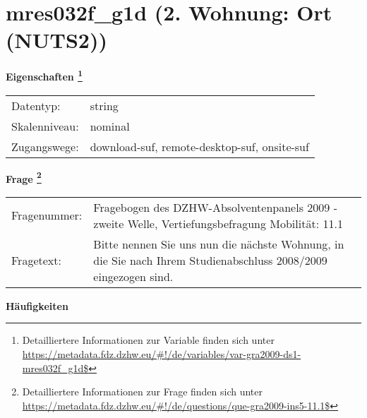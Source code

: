 
    \setcounter{footnote}{0}

    \vspace*{-1.8cm}
	\section{mres032f\_g1d (2. Wohnung: Ort (NUTS2))}
	\label{section:mres032f_g1d}



    \vspace*{0.5cm}
    \noindent\textbf{Eigenschaften
	\footnote{Detailliertere Informationen zur Variable finden sich unter
		\url{https://metadata.fdz.dzhw.eu/\#!/de/variables/var-gra2009-ds1-mres032f_g1d$}}}\\
	\begin{tabularx}{\hsize}{@{}lX}
	Datentyp: & string \\
	Skalenniveau: & nominal \\
	Zugangswege: &
	  download-suf, 
	  remote-desktop-suf, 
	  onsite-suf
 \\
    \end{tabularx}



				\vspace*{0.5cm}
                \noindent\textbf{Frage
	                \footnote{Detailliertere Informationen zur Frage finden sich unter
		              \url{https://metadata.fdz.dzhw.eu/\#!/de/questions/que-gra2009-ins5-11.1$}}}\\
				\begin{tabularx}{\hsize}{@{}lX}
					Fragenummer: &
					  Fragebogen des DZHW-Absolventenpanels 2009 - zweite Welle, Vertiefungsbefragung Mobilität:
					  11.1
 \\
					Fragetext: & Bitte nennen Sie uns nun die nächste Wohnung, in die Sie nach Ihrem Studienabschluss 2008/2009 eingezogen sind. \\
				\end{tabularx}





        		\vspace*{0.5cm}
                \noindent\textbf{Häufigkeiten}

